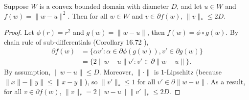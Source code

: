\begin{proposition}
\label{prop:DP-OTB:subdiff-chain-rule}
Suppose $W$ is a convex bounded domain with diameter $D$, and let $u\in W$ and $f(w)=\|w-u\|^2$. Then for all $w\in W$ and $v\in \partial f(w)$, $\|v\|_*\leq 2D$.
\end{proposition}

\begin{proof}
Let $\phi(r)=r^2$ and $g(w)=\|w-u\|$, then $f(w) = \phi\circ g(w)$. By chain rule of sub-differentials (Corollary 16.72 \cite{bauschke2011convex}), 
\begin{align*}
    \partial f(w)
    &= \{\alpha v' : \alpha\in \partial \phi(g(w)), v'\in\partial g(w) \} \\
    &= \{2\|w-u\| v' : v'\in\partial \|w-u\|\}.
\end{align*}
By assumption, $\|w-u\|\leq D$. Moreover, $\|\cdot\|$ is $1$-Lipschitz (because $\|x\|-\|y\|\leq \|x-y\|$), so $\|v'\|_*\leq 1$ for all $v'\in\partial \|w-u\|$. As a result, for all $v\in \partial f(w)$, $\|v\|_* = 2\|w-u\|\|v'\|_* \leq 2D$.
\end{proof}